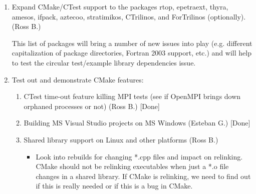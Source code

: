 \documentclass[pdf,ps2pdf,11pt]{SANDreport}
\begin{document}
\begin{enumerate}
\begin{enumerate}
  {}\item Add Windows, MAC, and Linux nightly testing for
  Trilinos/CMake (Esteban G.)

  {}\item (Lower priority just because it is a slam dunk with no risk)
  Implement and demonstrate the generation of export makefiles in the
  same exact way the current autotools system
  does\footnote{Specifically requested by Mike Heroux and Roger
  Pawlowski} (Ross B.) ... This is *not* going to be hard ...

  {}\item (Low priority) Make the default 'make' target just build
  libraries and add 'tests' and 'examples' targets just like the
  current autotools system does (Ross B.)

  {}\item (Low priority) Implement two-state configuration and
  building to support circular dependencies between tests/examples and
  up-stream libraries.  Test this in a superficial way?

  \end{enumerate}

{}\item Expand CMake/CTest support to the packages rtop, epetraext,
thyra, amesos, ifpack, aztecoo, stratimikos, CTrilinos, and
ForTrilinos (optionally). (Ross B.)

This list of packages will bring a number of new issues into play
(e.g. different capitalization of package directories, Fortran 2003
support, etc.)  and will help to test the circular test/example
library dependencies issue.

{}\item Test out and demonstrate CMake features:

  \begin{enumerate}

  {}\item CTest time-out feature killing MPI tests (see if OpenMPI
  brings down orphaned processes or not) (Ross B.) [Done]

  {}\item Building MS Visual Studio projects on MS Windows (Esteban
  G.) [Done]

  {}\item Shared library support on Linux and other platforms (Ross B.)

    \begin{itemize}

    {}\item Look into rebuilds for changing *.cpp files and impact on
    relinking.  CMake should not be relinking executables when just a
    *.o file changes in a shared library.  If CMake is relinking, we
    need to find out if this is really needed or if this is a bug in
    CMake.


\end{itemize}
\end{enumerate}
\end{enumerate}
\end{document}
